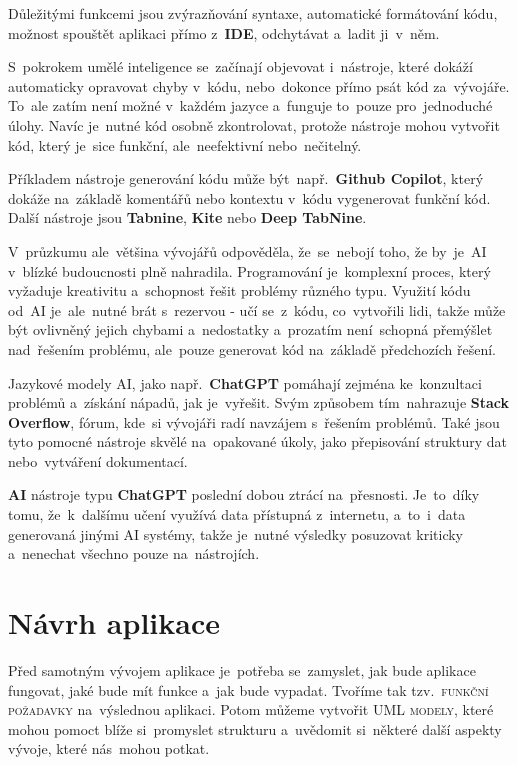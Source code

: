 \documentclass[14pt,a4paper]{article}
\begin{document}
        Důležitými funkcemi jsou zvýrazňování syntaxe, automatické formátování kódu, možnost spouštět aplikaci přímo z~\textbf{IDE}, odchytávat a~ladit ji~v~něm.
        
        S~pokrokem umělé inteligence se~začínají objevovat i~nástroje, které dokáží automaticky opravovat chyby v~kódu, nebo~dokonce přímo psát kód za~vývojáře. To~ale zatím není možné v~každém jazyce a~funguje to~pouze pro~jednoduché úlohy. Navíc je~nutné kód osobně zkontrolovat, protože nástroje mohou vytvořit kód, který je~sice funkční, ale~neefektivní nebo~nečitelný.

        Příkladem nástroje generování kódu může být~např.~\textbf{Github Copilot}, který dokáže na~základě komentářů nebo kontextu v~kódu vygenerovat funkční kód. Další nástroje jsou \textbf{Tabnine}, \textbf{Kite} nebo \textbf{Deep TabNine}.
        
        V~průzkumu \parencite{zerotomasteryStateOfAI} ale~většina vývojářů odpověděla, že~se~nebojí toho, že by~je~\textsc{AI} v~blízké budoucnosti plně nahradila. Programování je~komplexní proces, který vyžaduje kreativitu a~schopnost řešit problémy různého typu. Využití kódu od~\textsc{AI} je~ale~nutné brát s~rezervou - učí se~z~kódu, co~vytvořili lidi, takže může být ovlivněný jejich chybami a~nedostatky a~prozatím není~schopná přemýšlet nad~řešením problému, ale~pouze generovat kód na~základě předchozích řešení.
        
        Jazykové modely \textsc{AI}, jako např.~\textbf{ChatGPT} pomáhají zejména ke~konzultaci problémů a~získání nápadů, jak je~vyřešit. Svým způsobem tím~nahrazuje \textbf{Stack Overflow}, fórum, kde~si vývojáři radí navzájem s~řešením problémů. Také jsou tyto pomocné nástroje skvělé na~opakované úkoly, jako přepisování struktury dat nebo~vytváření dokumentací.

        \textbf{AI} nástroje typu \textbf{ChatGPT} poslední dobou ztrácí na~přesnosti. Je~to~díky tomu, že~k~dalšímu učení využívá data přístupná z~internetu, a~to~i~data generovaná jinými \textsc{AI} systémy, takže je~nutné výsledky posuzovat kriticky a~nenechat všechno pouze na~nástrojích.\parencite{computerworld:AI}

	\section{Návrh aplikace}
        Před samotným vývojem aplikace je~potřeba se~zamyslet, jak bude aplikace fungovat, jaké bude mít funkce a~jak bude vypadat. Tvoříme tak tzv.~\textsc{funkční požadavky} na~výslednou aplikaci. Potom můžeme vytvořit \textsc{UML modely}, které mohou pomoct blíže si~promyslet strukturu a~uvědomit si~některé další aspekty vývoje, které nás~mohou potkat.
\end{document}

